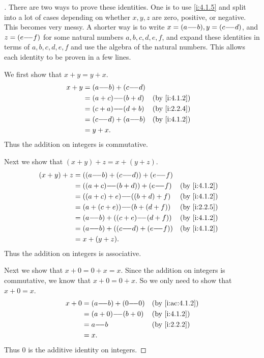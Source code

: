 \begin{proof}[]
  There are two ways to prove these identities.
  One is to use \cref{i:4.1.5} and split into a lot of cases depending on whether \(x, y, z\) are zero, positive, or negative.
  This becomes very messy.
  A shorter way is to write \(x = (a {-}\!{-} b), y = (c {-}\!{-} d)\), and \(z = (e {-}\!{-} f)\) for some natural numbers \(a, b, c, d, e, f\), and expand these identities in terms of \(a, b, c, d, e, f\) and use the algebra of the natural numbers.
  This allows each identity to be proven in a few lines.

  We first show that \(x + y = y + x\).
  \begin{align*}
    x + y & = (a \mm b) + (c \mm d) &                  \\
          & = (a + c) \mm (b + d)   &   & \by{i:4.1.2} \\
          & = (c + a) \mm (d + b)   &   & \by{i:2.2.4} \\
          & = (c \mm d) + (a \mm b) &   & \by{i:4.1.2} \\
          & = y + x.
  \end{align*}
  Thus the addition on integers is commutative.

  Next we show that \((x + y) + z = x + (y + z)\).
  \begin{align*}
    (x + y) + z & = ((a \mm b) + (c \mm d)) + (e \mm f)                   \\
                & = ((a + c) \mm (b + d)) + (e \mm f)   &  & \by{i:4.1.2} \\
                & = ((a + c) + e) \mm ((b + d) + f)     &  & \by{i:4.1.2} \\
                & = (a + (c + e)) \mm (b + (d + f))     &  & \by{i:2.2.5} \\
                & = (a \mm b) + ((c + e) \mm (d + f))   &  & \by{i:4.1.2} \\
                & = (a \mm b) + ((c \mm d) + (e \mm f)) &  & \by{i:4.1.2} \\
                & = x + (y + z).
  \end{align*}
  Thus the addition on integers is associative.

  Next we show that \(x + 0 = 0 + x = x\).
  Since the addition on integers is commutative, we know that \(x + 0 = 0 + x\).
  So we only need to show that \(x + 0 = x\).
  \begin{align*}
    x + 0 & = (a \mm b) + (0 \mm 0) &  & \by{i:ac:4.1.2} \\
          & = (a + 0) \mm (b + 0)   &  & \by{i:4.1.2}    \\
          & = a \mm b               &  & \by{i:2.2.2}    \\
          & = x.
  \end{align*}
  Thus \(0\) is the additive identity on integers.


\end{proof}
